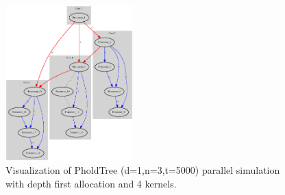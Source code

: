 \begin{figure}
    \center
    \includegraphics[width=\plotfraction\columnwidth,  height=6cm, keepaspectratio]{fig/pholdtreed1n3t5000c4DFS.eps}
    \caption{Visualization of PholdTree (d=1,n=3,t=5000) parallel simulation with depth first allocation and 4 kernels.}
    \label{fig:pholdtree_visualize_parDFS}
\end{figure}
